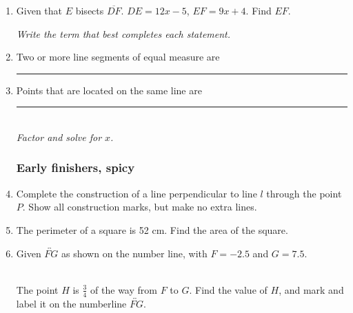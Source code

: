 \documentclass[12pt, twoside]{article}
\begin{document}
\begin{enumerate}
\newpage
  \item Given that $E$ bisects $\overline{DF}$. $DE=12x-5$, $EF=9x+4$. Find ${EF}$.
  \vspace{9cm}

  \emph{Write the term that best completes each statement.}
  \item Two or more line segments of equal measure are \rule{4cm}{0.15mm} \bigskip

  \item Points that are located on the same line are \rule{4cm}{0.15mm} \\[15pt]

  \emph{Factor and solve for $x$.}
  
\newpage

  \subsubsection*{Early finishers, spicy}

  \item Complete the construction of a line perpendicular to line $l$ through the point $P$. Show all construction marks, but make no extra lines. \vspace{2cm}
  \begin{center}
  \end{center} \vspace{6cm}

  \item The perimeter of a square is 52 cm. Find the area of the square.

\newpage
\item Given $\overleftrightarrow{FG}$ as shown on the number line, with $F=-2.5$ and $G=7.5$. \\[20pt] %
  \\[5pt]
  The point $H$ is $\frac{3}{4}$ of the way from $F$ to $G$. Find the value of $H$, and mark and label it on the numberline $\overleftrightarrow{FG}$. 
  \vspace{6cm}


\end{enumerate}
\end{document}
